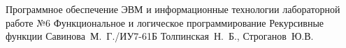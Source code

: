\documentclass{bmstu}
\begin{document}
	
	{Программное обеспечение ЭВМ и информационные технологии}
	{лабораторной работе №6}
	{Функциональное и логическое программирование}
	{Рекурсивные функции}
	{}
	{Савинова~М.~Г./ИУ7-61Б}
	{Толпинская~Н.~Б., Строганов~Ю.В.}
	
	
	
	
	
\end{document}
